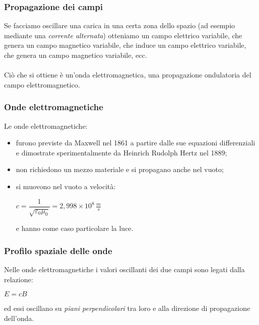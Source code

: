 \documentclass[]{beamer}
\theoremstyle{plain}
\begin{document}
\begin{frame}
  \frametitle{Propagazione dei campi}
  Se facciamo oscillare una carica in una certa zona dello spazio (ad esempio mediante una \emph{corrente alternata}) otteniamo un \alert<1>{campo elettrico variabile},{\pause} che genera un \alert<2>{campo magnetico variabile},{\pause} che induce un \alert<3>{campo elettrico variabile},{\pause} che genera un \alert<4>{campo magnetico variabile}, ecc.\\\pause~\\Ciò che si ottiene è un'\alert<5>{onda elettromagnetica}, una propagazione ondulatoria del campo elettromagnetico.
\end{frame}



\begin{frame}
  \frametitle{Onde elettromagnetiche}
  Le onde elettromagnetiche:
  \begin{itemize}
    \item furono previste da Maxwell nel 1861 a partire dalle sue equazioni differenziali e dimostrate sperimentalmente da Heinrich Rudolph Hertz nel 1889;\pause
    \item non richiedono un mezzo materiale e si propagano anche nel vuoto;\pause
    \item si muovono nel vuoto a velocità:
    \begin{center}
    $ c = \dfrac{1}{\sqrt{\varepsilon_0 \mu_0}} = 2,998 \times 10^8 \, \frac{m}{s} $
    \end{center}
    e hanno come caso particolare la luce.
  \end{itemize}
\end{frame}


\begin{frame}
  \frametitle{Profilo spaziale delle onde}
  Nelle onde elettromagnetiche i valori oscillanti dei due campi sono legati dalla relazione:
  \begin{center}
  $ E = cB $
  \end{center}
  ed essi oscillano su \emph{piani perpendicolari} tra loro e alla direzione di propagazione dell'onda.\pause
  \begin{figure}
  \end{figure}
\end{frame}
\end{document}
